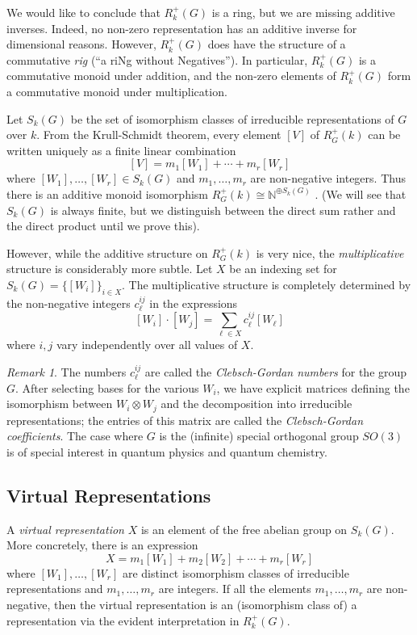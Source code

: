 \documentclass[12pt]{article}
\theoremstyle{plain}
\theoremstyle{definition}
\theoremstyle{remark}
\newtheorem{remark}[theorem]{Remark}
\numberwithin{equation}{section}
\begin{document}
We would like to conclude that $R^+_k(G)$ is a ring,
but we are missing additive inverses.  Indeed, no non-zero
representation has an additive inverse for dimensional reasons.
However, $R^+_k(G)$ does have the structure of a commutative \emph{rig}
(``a riNg without Negatives'').
In particular, $R^+_k(G)$ is a commutative monoid under addition,
and the non-zero elements of $R^+_k(G)$ form a commutative monoid under
multiplication.

Let $S_k(G)$ be the set of isomorphism classes of
irreducible representations of $G$ over $k$.
From the Krull-Schmidt theorem, every element $[V]$ of $R^+_G(k)$
can be written uniquely as a finite linear combination
\[
[V] = m_1 [W_1] + \cdots + m_r [W_r]
\]
where $[W_1],\ldots,[W_r] \in S_k(G)$ and $m_1,\ldots, m_r$ are
non-negative integers.
Thus there is an additive monoid isomorphism
$R^+_G(k) \cong \mathbb{N}^{\oplus S_k(G)}$ .
(We will see that $S_k(G)$ is always finite, but we distinguish between
the direct sum rather and the direct product until we prove this).

However, while the additive structure on $R^+_G(k)$ is very nice,
the \emph{multiplicative} structure is considerably more subtle.
Let $X$ be an indexing set for $S_k(G) = \{[W_i]\}_{i \in X}$.
The multiplicative structure is completely determined by the
non-negative integers $c^{ij}_\ell$ in the expressions
\[
[W_i] \cdot [W_j] = \sum_{\ell \in X} c^{ij}_\ell [W_\ell]
\]
where $i,j$ vary independently over all values of $X$.

\begin{remark}
The numbers $c^{ij}_\ell$ are called the \emph{Clebsch-Gordan numbers}
for the group $G$.  After selecting bases for the various $W_i$,
we have explicit matrices defining the isomorphism between
$W_i \otimes W_j$ and the decomposition into irreducible representations;
the entries of this matrix are called the \emph{Clebsch-Gordan
coefficients}.  The case where $G$ is the (infinite) special orthogonal
group $SO(3)$ is of special interest in quantum physics and quantum
chemistry.
\end{remark}

\subsection{Virtual Representations}

A \emph{virtual representation} $X$ is an element of the free abelian
group on $S_k(G)$.
More concretely, there is an expression
\[
X = m_1 [W_1] + m_2 [W_2] + \cdots + m_r [W_r]
\]
where $[W_1],\ldots,[W_r]$ are distinct isomorphism classes of
irreducible representations
and $m_1,\ldots, m_r$ are integers.
If all the elements $m_1,\ldots,m_r$ are non-negative,
then the virtual representation is an (isomorphism class of) a
representation via the evident interpretation in $R^+_k(G)$.
\end{document}
